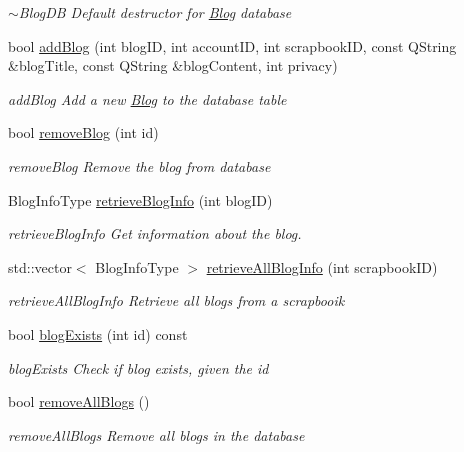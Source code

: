 \begin{DoxyCompactItemize}
\begin{DoxyCompactList}\small\item\em $\sim$\+Blog\+DB Default destructor for \hyperlink{classBlog}{Blog} database \end{DoxyCompactList}\item 
bool \hyperlink{classBlogDB_a8a9d5dcd4ba128a20aa29ad1c1c6380d}{add\+Blog} (int blog\+ID, int account\+ID, int scrapbook\+ID, const Q\+String \&blog\+Title, const Q\+String \&blog\+Content, int privacy)
\begin{DoxyCompactList}\small\item\em add\+Blog Add a new \hyperlink{classBlog}{Blog} to the database table \end{DoxyCompactList}\item 
bool \hyperlink{classBlogDB_a859bde805f823538f0b5c1b80a05360f}{remove\+Blog} (int id)
\begin{DoxyCompactList}\small\item\em remove\+Blog Remove the blog from database \end{DoxyCompactList}\item 
Blog\+Info\+Type \hyperlink{classBlogDB_a225b7f0642fe3e1559a4031d46f4cbf4}{retrieve\+Blog\+Info} (int blog\+ID)
\begin{DoxyCompactList}\small\item\em retrieve\+Blog\+Info Get information about the blog. \end{DoxyCompactList}\item 
std\+::vector$<$ Blog\+Info\+Type $>$ \hyperlink{classBlogDB_a8b64dfbf327f4bdb5474e03de22732c8}{retrieve\+All\+Blog\+Info} (int scrapbook\+ID)
\begin{DoxyCompactList}\small\item\em retrieve\+All\+Blog\+Info Retrieve all blogs from a scrapbooik \end{DoxyCompactList}\item 
bool \hyperlink{classBlogDB_a2835c0e55293c8c32d20cbdbeceaa320}{blog\+Exists} (int id) const 
\begin{DoxyCompactList}\small\item\em blog\+Exists Check if blog exists, given the id \end{DoxyCompactList}\item 
bool \hyperlink{classBlogDB_ada79a507a12ca651dfc0eb68fbe1bef8}{remove\+All\+Blogs} ()
\begin{DoxyCompactList}\small\item\em remove\+All\+Blogs Remove all blogs in the database \end{DoxyCompactList}\end{DoxyCompactItemize}
